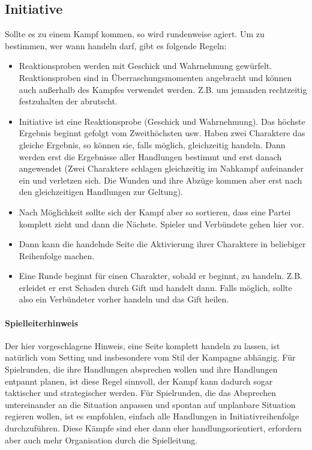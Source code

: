 \documentclass{article}
\begin{document}
\begin{center}
\subsection{Initiative}
\end{center}

Sollte es zu einem Kampf kommen, so wird rundenweise agiert. Um zu bestimmen, wer wann handeln darf, gibt es folgende
Regeln:

\begin{itemize}
\item Reaktionsproben werden mit Geschick und Wahrnehmung gewürfelt. Reaktionsproben sind in Überraschungsmomenten angebracht und können auch außerhalb des Kampfes verwendet werden. Z.B. um jemanden rechtzeitig festzuhalten der abrutscht.
\item Initiative ist eine Reaktionsprobe (Geschick und Wahrnehmung). Das höchste Ergebnis beginnt gefolgt vom Zweithöchsten usw. Haben zwei Charaktere das gleiche Ergebnis, so können sie, falls möglich, gleichzeitig handeln. Dann werden erst die Ergebnisse aller Handlungen bestimmt und erst danach angewendet (Zwei Charaktere schlagen gleichzeitig im Nahkampf aufeinander ein und verletzen sich. Die Wunden und ihre Abzüge kommen aber erst nach den gleichzeitigen Handlungen zur Geltung).
\item Nach Möglichkeit sollte sich der Kampf aber so sortieren, dass eine Partei komplett zieht und dann die Nächste. Spieler und Verbündete gehen hier vor.
\item Dann kann die handelnde Seite die Aktivierung ihrer Charaktere in beliebiger Reihenfolge machen.
\item Eine Runde beginnt für einen Charakter, sobald er beginnt, zu handeln. Z.B. erleidet er erst Schaden durch Gift und handelt dann. Falls möglich, sollte also ein Verbündeter vorher handeln und das Gift heilen.
\end{itemize}

\begin{mdframed}[hidealllines=true, backgroundcolor=black!10]
\paragraph{Spielleiterhinweis}

Der hier vorgeschlagene Hinweis, eine Seite komplett handeln zu lassen, ist natürlich vom Setting und insbesondere
vom Stil der Kampagne abhängig. Für Spielrunden, die ihre Handlungen absprechen wollen und ihre Handlungen
entpannt planen, ist diese Regel sinnvoll, der Kampf kann dadurch sogar taktischer und strategischer werden. Für
Spielrunden, die das Absprechen untereinander an die Situation anpassen und spontan auf unplanbare Situation regieren
wollen, ist es empfohlen, einfach alle Handlungen in Initiativreihenfolge durchzuführen. Diese Kämpfe sind eher dann eher
handlungsorientiert, erfordern aber auch mehr Organisation durch die Spielleitung.

\end{mdframed}
\end{document}
